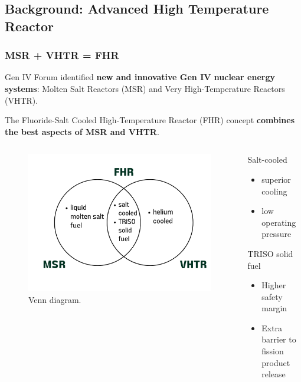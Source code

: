 \subsection{Background: Advanced High Temperature Reactor}
    \begin{frame}
        \frametitle{MSR + VHTR = FHR}
        Gen IV Forum identified \textbf{new and innovative Gen IV nuclear energy systems}: 
        Molten Salt Reactors (MSR) and Very High-Temperature Reactors (VHTR). 
        
        \vspace{0.2cm}
        The Fluoride-Salt Cooled High-Temperature Reactor (FHR) concept \textbf{combines 
        the best aspects of MSR and VHTR}.
        \vspace{-0.4cm}
        \begin{columns}
        \begin{column}{0.7\textwidth}
        \begin{figure}[]
            \centering
            \includegraphics[width=\linewidth]{figures/fhr_venn.png} 
            \caption{Venn diagram.}
        \end{figure}
        \end{column}
        \begin{column}{0.3\textwidth}
            Salt-cooled
            \begin{itemize}
                \item superior cooling 
                \item low operating pressure 
            \end{itemize} 
            \acrfull{TRISO} solid fuel
            \begin{itemize}
                \item Higher safety margin 
                \item Extra barrier to fission product release
            \end{itemize}
        \end{column}
    \end{columns}
        \end{frame}

